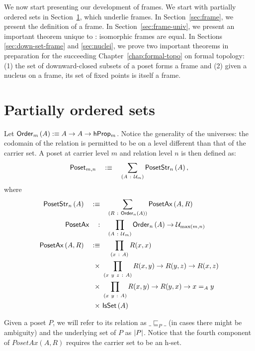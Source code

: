 We now start presenting our development of frames. We start with partially ordered sets in
Section~\ref{sec:poset}, which underlie frames. In Section~\ref{sec:frame}, we present the
definition of a frame. In Section~\ref{sec:frame-univ}, we present an important theorem
unique to \UF{}: isomorphic frames are equal. In Sections \ref{sec:down-set-frame} and
\ref{sec:nuclei}, we prove two important theorems in preparation for the succeeding
Chapter~\ref{chap:formal-topo} on formal topology: (1) the set of downward-closed subsets
of a poset forms a frame and (2) given a nucleus on a frame, its set of fixed points is
itself a frame.

\section{Partially ordered sets}\label{sec:poset}

\begin{defn}[Poset]
  Let $\mathsf{Order}{}_{m}\left(A\right) :\equiv A \rightarrow A \rightarrow \mathsf{hProp}{}_m$. Notice the generality of the universes: the
  codomain of the relation is permitted to be on a level different than that of the
  carrier set. A poset at carrier level $m$ and relation level $n$ is then defined as:
  \begin{equation*}
    \mathsf{Poset}_{m, n} \quad:\equiv\quad \sum_{(A~:~\mathcal{U}_m)} \mathsf{PosetStr}{}_{n}\left(A\right),
  \end{equation*}
  where
  \begin{align*}
    \mathsf{PosetStr}{}_{n}\left(A\right) \quad:\equiv&\quad \sum_{(R~:~\mathsf{Order}{}_{n}\left(A\right))} \mathsf{PosetAx}{}\left(A, R\right)\\
    \mathsf{PosetAx} \quad:&\quad \prod_{(A~:~\mathcal{U}{}_m)} \mathsf{Order}{}_{n}\left(A\right) \rightarrow \mathcal{U}_{\max(m, n)}\\
    \mathsf{PosetAx}{}\left(A, R\right) \quad:\equiv&\quad ~\prod_{(x~:~A)} R(x, x)\\
                      \times&~\prod_{(x~y~z~:~A)} R(x, y) \rightarrow R(y, z) \rightarrow R(x, z)\\
                      \times&~\prod_{(x~y~:~A)} R(x, y) \rightarrow R(y, x) \rightarrow x =_A y\\
                      \times&~\mathsf{IsSet}\left(A\right)
  \end{align*}
\end{defn}

Given a poset $P$, we will refer to its relation as $\_\sqsubseteq_P\_$ (in cases there might be
ambiguity) and the underlying set of $P$ as $\left| P \right|$. Notice that the fourth component of
$PosetAx(A, R)$ requires the carrier set to be an h-set.

